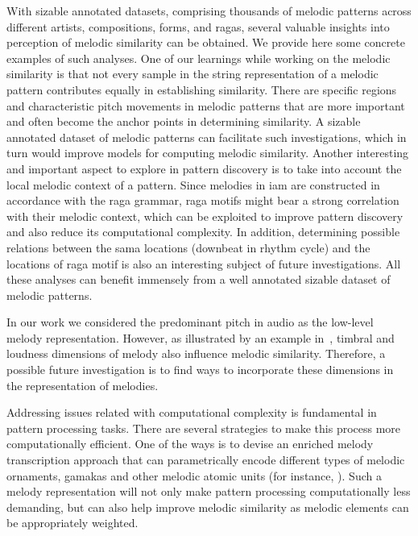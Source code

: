 With sizable annotated datasets, comprising thousands of melodic patterns across different artists, compositions, forms, and \glspl{raga}, several valuable insights into perception of melodic similarity can be obtained. We provide here some concrete examples of such analyses. One of our learnings while working on the melodic similarity is that not every sample in the string representation of a melodic pattern contributes equally in establishing similarity. There are specific regions and characteristic pitch movements in melodic patterns that are more important and often become the anchor points in determining similarity. A sizable annotated dataset of melodic patterns can facilitate such investigations, which in turn would improve models for computing melodic similarity. Another interesting and important aspect to explore in pattern discovery is to take into account the local melodic context of a pattern. Since melodies in \gls{iam} are constructed in accordance with the \gls{raga} grammar, \gls{raga} motifs might bear a strong correlation with their melodic context, which can be exploited to improve pattern discovery and also reduce its computational complexity. In addition, determining possible relations between the \gls{sama} locations (downbeat in rhythm cycle) and the locations of \gls{raga} motif is also an interesting subject of future investigations. All these analyses can benefit immensely from a well annotated sizable dataset of melodic patterns.

In our work we considered the predominant pitch in audio as the low-level melody representation. However, as illustrated by an example in~, timbral and loudness dimensions of melody also influence melodic similarity. Therefore, a possible future investigation is to find ways to incorporate these dimensions in the representation of melodies.

Addressing issues related with computational complexity is fundamental in pattern processing tasks. There are several strategies to make this process more computationally efficient. One of the ways is to devise an enriched melody transcription approach that can parametrically encode different types of melodic ornaments, \glspl{gamaka} and other melodic atomic units (for instance, \cite{widdess1994involving,rao1999raga}). Such a melody representation will not only make pattern processing computationally less demanding, but can also help improve melodic similarity as melodic elements can be appropriately weighted.

